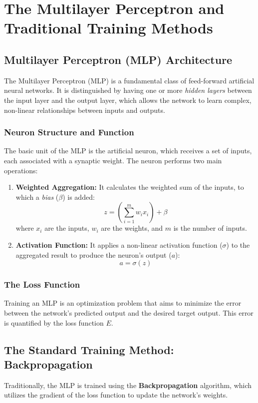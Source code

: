 \chapter{The Multilayer Perceptron and Traditional Training Methods}
\label{chap:mlp_intro}

\section{Multilayer Perceptron (MLP) Architecture}
The Multilayer Perceptron (MLP) is a fundamental class of feed-forward artificial neural networks. It is distinguished by having one or more \textit{hidden layers} between the input layer and the output layer, which allows the network to learn complex, non-linear relationships between inputs and outputs.

\subsection{Neuron Structure and Function}
The basic unit of the MLP is the artificial neuron, which receives a set of inputs, each associated with a synaptic weight. The neuron performs two main operations:
\begin{enumerate}
    \item \textbf{Weighted Aggregation:} It calculates the weighted sum of the inputs, to which a \textit{bias} ($\beta$) is added:
    $$z = \left(\sum_{i=1}^{m} w_i x_i\right) + \beta$$
    where $x_i$ are the inputs, $w_i$ are the weights, and $m$ is the number of inputs.
    \item \textbf{Activation Function:} It applies a non-linear activation function ($\sigma$) to the aggregated result to produce the neuron's output ($a$):
    $$a = \sigma(z)$$
\end{enumerate}

\subsection{The Loss Function}
Training an MLP is an optimization problem that aims to minimize the error between the network's predicted output and the desired target output. This error is quantified by the loss function $E$.

\section{The Standard Training Method: Backpropagation}
Traditionally, the MLP is trained using the \textbf{Backpropagation} algorithm, which utilizes the gradient of the loss function to update the network's weights.

